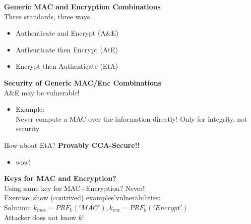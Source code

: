 \documentclass{article}
\begin{document}
\textbf{Generic MAC and Encryption Combinations}\\
Three standards, three ways...
\begin{itemize}
	\item Authenticate and Encrypt (A\&E)
	\item Authenticate then Encrypt (AtE)
	\item Encrypt then Authenticate (EtA)
\end{itemize}
\textbf{Security of Generic MAC/Enc Combinations}\\
A\&E may be vulnerable!
\begin{itemize}
	\item Example:\\
		Never compute a MAC over the information directly! Only for integrity, not security
\end{itemize}
How about EtA? \textbf{Provably CCA-Secure!!}
\begin{itemize}
	\item wow!
\end{itemize}
\textbf{Keys for MAC and Encryption?}\\
Using same key for MAC+Encryption? Never!\\
Exercise: show (contrived) examples\rq vulnerabilities:\\
Solution: $k_{mac} = PRF_k('MAC'), k_{enc} = PRF_k('Encrypt')$\\
Attacker does not know $k$!
\end{document}
